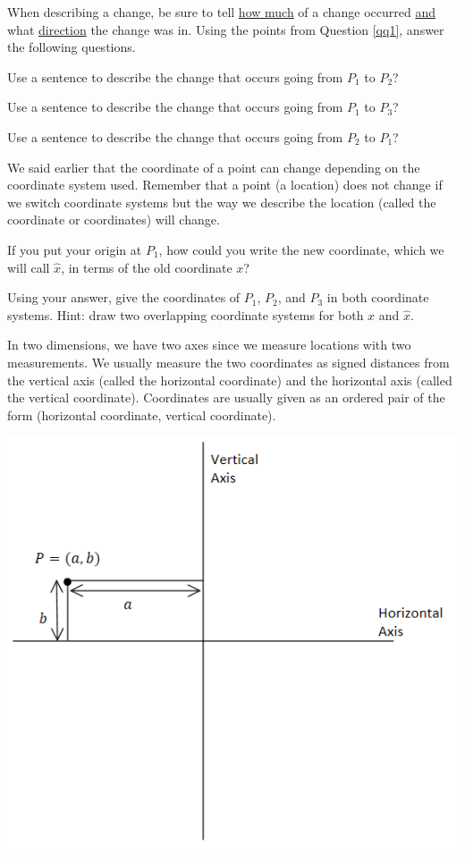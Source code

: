 \bq When describing a change, be sure to tell \underline{how much} of a change occurred \underline{and} what \underline{direction} the change was in. Using the points from Question \ref{qq1}, answer the following questions.
\be
\item Use a sentence to describe the change that occurs going from $P_1$ to $P_2$?
\item Use a sentence to describe the change that occurs going from $P_1$ to $P_3$?
\item Use a sentence to describe the change that occurs going from $P_2$ to $P_1$?
\ee\eq

\bq\label{qpoints} We said earlier that the coordinate of a point can change depending on the coordinate system used. Remember that a point (a location) does not change if we switch coordinate systems but the way we describe the location (called the coordinate or coordinates) will change.\be
\item If you put your origin at $P_1$, how could you write the new coordinate, which we will call $\hat{x}$, in terms of the old coordinate $x$?
\item Using your answer, give the coordinates of $P_1$, $P_2$, and $P_3$ in both coordinate systems. Hint: draw two overlapping coordinate systems for both $x$ and $\hat{x}$.
\ee
\eq


\begin{info}In two dimensions, we have two axes since we measure locations with two measurements. We usually measure the two coordinates as signed distances from the vertical axis (called the horizontal coordinate) and the horizontal axis (called the vertical coordinate). Coordinates are usually given as an ordered pair of the form (horizontal coordinate, vertical coordinate).

\begin{center} \includegraphics[scale=.75]{2dcoord.png} \end{center}

\end{info}

